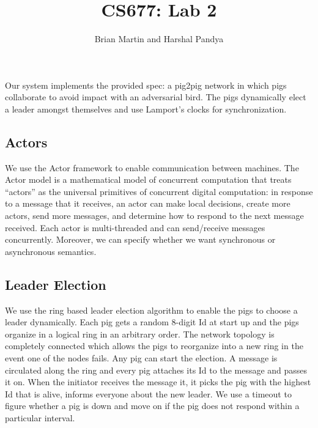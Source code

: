 \documentclass[]{article}
\title{CS677: Lab 2}
\author{Brian Martin and Harshal Pandya}
\date{}
\begin{document}
\maketitle

Our system implements the provided spec: a pig2pig network in which pigs
collaborate to avoid impact with an adversarial bird. The pigs dynamically 
elect a leader amongst themselves and use Lamport's clocks for synchronization.

\subsection{Actors}
We use the Actor framework to enable communication between machines. The
Actor model is a mathematical model of concurrent computation that
treats ``actors'' as the universal primitives of concurrent digital
computation: in response to a message that it receives, an actor can
make local decisions, create more actors, send more messages, and
determine how to respond to the next message received. Each actor is multi-threaded 
and can send/receive messages concurrently. Moreover, we can specify whether we want 
synchronous or asynchronous semantics.

\subsection{Leader Election}
We use the ring based leader election algorithm to enable the pigs to choose a leader dynamically.
Each pig gets a random 8-digit Id at start up and the pigs organize in a logical ring in an arbitrary order.
The network topology is completely connected which allows the pigs to reorganize into a new ring in the
event one of the nodes fails. Any pig can start the election. A message is circulated along the ring and every 
pig attaches its Id to the message and passes it on. When the initiator receives the message it, it picks the 
pig with the highest Id that is alive, informs everyone about the new leader. We use a timeout to figure whether 
a pig is down and move on if the pig does not respond within a particular interval.
\end{document}
